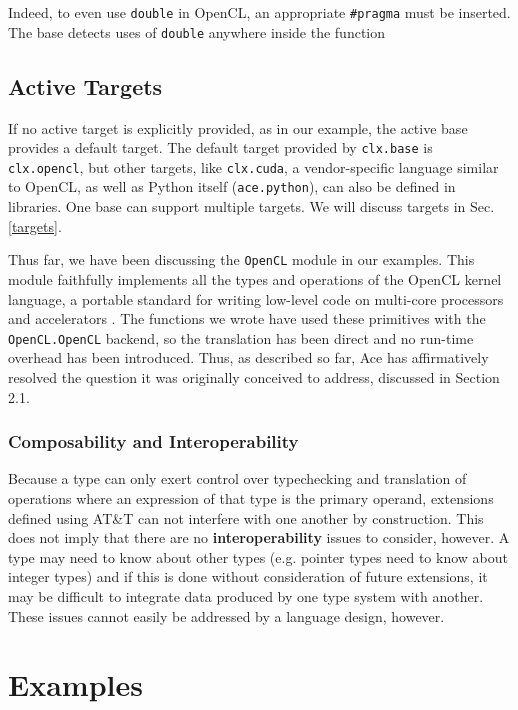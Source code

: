 \documentclass[9pt,preprint]{sigplanconf}
\begin{document}
Indeed, to even use \verb|double| in OpenCL, an appropriate \verb|#pragma| must be inserted. The base detects uses of \verb|double| anywhere inside the function 

\subsection{Active Targets}\label{atargets}

If no active target is explicitly provided, as in our example, the active base  provides a default target. The default target provided by \verb|clx.base| is \verb|clx.opencl|, but other targets, like \verb|clx.cuda|, a vendor-specific language similar to OpenCL, as well as Python itself (\verb|ace.python|), can also be defined in libraries. One base can support multiple targets. We will discuss targets in Sec. \ref{targets}.

Thus far, we have been discussing the \verb|OpenCL| module in our examples. This module faithfully implements all the types and operations of the OpenCL kernel language, a portable standard for writing low-level code on multi-core processors and accelerators \cite{opencl11}. The functions we wrote have used these primitives with the \verb|OpenCL.OpenCL| backend, so the translation has been direct and no run-time overhead has been introduced. Thus, as described so far, Ace has affirmatively resolved the question it was originally conceived to address, discussed in Section 2.1. 

\subsubsection{Composability and Interoperability}\label{safety}
Because a type can only exert control over typechecking and translation of operations where an expression of that type is the primary operand, extensions defined using AT\&T can not interfere with one another by construction. This does not imply that there are no \textbf{interoperability} issues to consider, however. A type may need to know about other types (e.g. pointer types need to know about integer types) and if this is done without consideration of future extensions, it may be difficult to integrate data produced by one type system with another. These issues cannot easily be addressed by a language design, however.

\section{Examples}\label{examples}
\end{document}
